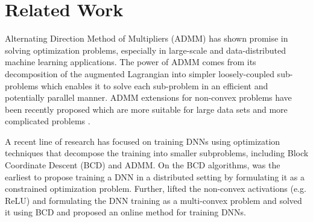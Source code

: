 
\section{Related Work}\label{sec:rel_work}

Alternating Direction Method of Multipliers (ADMM) has shown promise in solving optimization problems, especially in large-scale and data-distributed machine learning applications. The power of ADMM comes from its decomposition of the augmented Lagrangian into simpler loosely-coupled sub-problems which enables it to solve each sub-problem in an efficient and potentially parallel manner.
ADMM extensions for non-convex problems have been recently proposed which are more suitable for large data sets and more complicated problems \cite{wang2019global,huang2018mini}.



A recent line of research has focused on training DNNs using optimization techniques that decompose the training into smaller subproblems, including Block Coordinate Descent (BCD) and ADMM. On the BCD algorithms, \cite{carreira2014distributed} was the earliest to propose training a DNN in a distributed setting by formulating it as a constrained optimization problem. Further, \cite{zeng2018global,zhang2017convergent,askari2018lifted,gu2018fenchel} lifted the non-convex activations (e.g. ReLU) and formulating the DNN training as a multi-convex problem and solved it using BCD and \cite{choromanska2018beyond} proposed an online method for training DNNs. 


